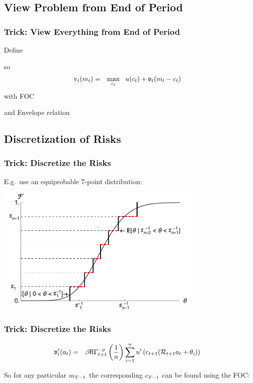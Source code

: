 \documentclass{beamer}
\begin{document}
\subsection{View Problem from End of Period}

\begin{frame}[label=Normalize]
\frametitle{Trick: View Everything from End of Period}

Define 

so 
\begin{eqnarray}
  \mathrm{v}_{t}(m_{t}) & = & \max_{c_{t}}~~ u(c_{t}) + \mathfrak{v}_{t}(m_{t}-c_{t})
\end{eqnarray}
with FOC

and Envelope relation


\end{frame}


\subsection{Discretization of Risks}
\begin{frame}[label=DiscretizeFig]
\frametitle{Trick: Discretize the Risks}

E.g.\ use an equiprobable 7-point distribution:\medskip\medskip

\includegraphics[width=4in]{./Figures/discreteApprox.pdf}

\end{frame}

\begin{frame}[label=DiscretizeEqn]
\frametitle{Trick: Discretize the Risks}

\begin{eqnarray}
        \mathfrak{v}_{t}^{\prime}({a}_{t}) & = &  \beta \mathsf{R} \Gamma_{t+1}^{-\rho} \left(\frac{1}{n}\right) \sum_{i=1}^{n} u^{\prime}\left(\mathrm{c}_{t+1}(\mathcal{R}_{t+1} {a}_{t} + \theta_{i})\right)
\end{eqnarray}

%

\pause 
So for any particular $m_{T-1}$ the corresponding $c_{T-1}$ can be found
using the FOC:



\end{frame}
\end{document}
